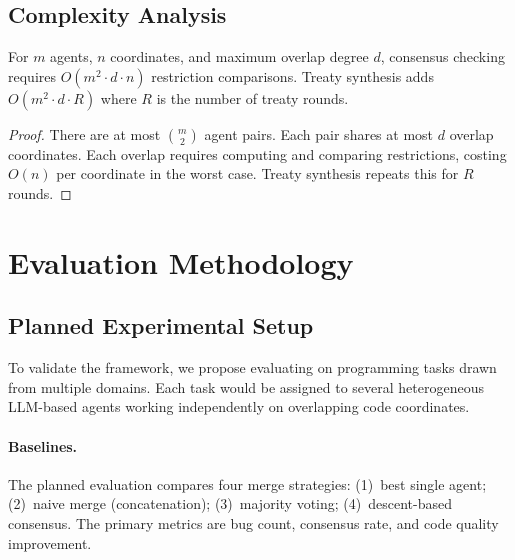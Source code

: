 \documentclass[11pt]{article}
\begin{document}
\subsection{Complexity Analysis}\label{subsec:complexity}

\begin{proposition}\label{prop:complexity}
For $m$ agents, $n$ coordinates, and maximum overlap degree $d$,
consensus checking requires $O(m^2 \cdot d \cdot n)$ restriction
comparisons.  Treaty synthesis adds $O(m^2 \cdot d \cdot R)$ where
$R$ is the number of treaty rounds.
\end{proposition}

\begin{proof}
There are at most $\binom{m}{2}$ agent pairs.  Each pair shares at
most $d$ overlap coordinates.  Each overlap requires computing and
comparing restrictions, costing $O(n)$ per coordinate in the worst
case.  Treaty synthesis repeats this for $R$ rounds.
\end{proof}


\section{Evaluation Methodology}\label{sec:experiments}

\subsection{Planned Experimental Setup}\label{subsec:setup}

To validate the framework, we propose evaluating on programming tasks
drawn from multiple domains.  Each task would be assigned to several
heterogeneous LLM-based agents working independently on overlapping
code coordinates.

\paragraph{Baselines.}
The planned evaluation compares four merge strategies:
(1)~best single agent; (2)~naive merge (concatenation);
(3)~majority voting; (4)~descent-based consensus.  The primary
metrics are bug count, consensus rate, and code quality improvement.
\end{document}
